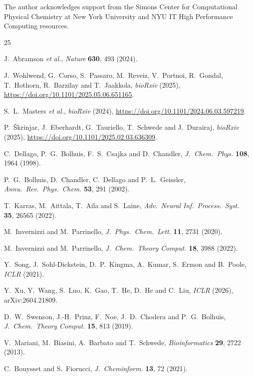 \documentclass[aps,prl,twocolumn,superscriptaddress,floatfix]{revtex4-2}
\begin{document}
\begin{acknowledgments}
The author acknowledges support from the Simons Center for Computational
Physical Chemistry at New York University and NYU IT High Performance
Computing resources.
\end{acknowledgments}

\begin{thebibliography}{25}

J.~Abramson \textit{et al.}, \textit{Nature} \textbf{630}, 493 (2024).

J.~Wohlwend, G.~Corso, S.~Passaro, M.~Reveiz, V.~Portnoi, R.~Gondal,
T.~Hothorn, R.~Barzilay and T.~Jaakkola, \textit{bioRxiv}
(2025), \url{https://doi.org/10.1101/2025.05.06.651165}.

S.~L.~Masters \textit{et al.}, \textit{bioRxiv}
(2024), \url{https://doi.org/10.1101/2024.06.03.597219}.

P.~\v{S}krinjar, J.~Eberhardt, G.~Tauriello, T.~Schwede and J.~Durairaj,
\textit{bioRxiv} (2025), \url{https://doi.org/10.1101/2025.02.03.636309}.

C.~Dellago, P.~G.~Bolhuis, F.~S.~Csajka and D.~Chandler,
\textit{J.~Chem.~Phys.} \textbf{108}, 1964 (1998).

P.~G.~Bolhuis, D.~Chandler, C.~Dellago and P.~L.~Geissler,
\textit{Annu.~Rev.~Phys.~Chem.} \textbf{53}, 291 (2002).

T.~Karras, M.~Aittala, T.~Aila and S.~Laine,
\textit{Adv.~Neural Inf.~Process.~Syst.} \textbf{35}, 26565 (2022).

M.~Invernizzi and M.~Parrinello,
\textit{J.~Phys.~Chem.~Lett.} \textbf{11}, 2731 (2020).

M.~Invernizzi and M.~Parrinello,
\textit{J.~Chem.~Theory Comput.} \textbf{18}, 3988 (2022).

Y.~Song, J.~Sohl-Dickstein, D.~P.~Kingma, A.~Kumar, S.~Ermon and B.~Poole,
\textit{ICLR} (2021).

Y.~Xu, Y.~Wang, S.~Luo, K.~Gao, T.~He, D.~He and C.~Liu,
\textit{ICLR} (2026), arXiv:2604.21809.

D.~W.~Swenson, J.-H.~Prinz, F.~Noe, J.~D.~Chodera and P.~G.~Bolhuis,
\textit{J.~Chem.~Theory Comput.} \textbf{15}, 813 (2019).

V.~Mariani, M.~Biasini, A.~Barbato and T.~Schwede,
\textit{Bioinformatics} \textbf{29}, 2722 (2013).

C.~Bouysset and S.~Fiorucci, \textit{J.~Cheminform.} \textbf{13}, 72 (2021).

\end{thebibliography}
\end{document}
